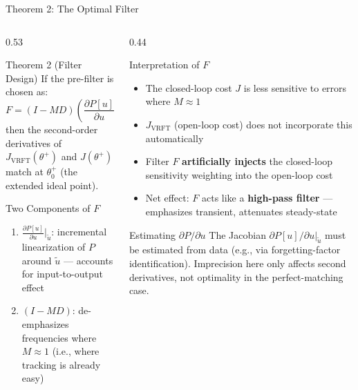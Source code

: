 \documentclass[aspectratio=169]{beamer}
\newcommand{\highlight}[1]{{\color{accentgreen!70!black}\textbf{#1}}}
\newcommand{\JJ}{J_{\mathrm{VRFT}}}
\newcommand{\Jopt}{J}
\begin{document}
\begin{frame}{Theorem 2: The Optimal Filter}
  \begin{columns}[T]
    \begin{column}{0.53\textwidth}
      \begin{block}{Theorem 2 (Filter Design)}
        If the pre-filter is chosen as:
        \[
          \boxed{F = (I - MD)\left(\frac{\partial P[u]}{\partial u}\bigg|_{\tilde{u}}\right)}
        \]
        then the second-order derivatives of $\JJ(\theta^+)$ and $\Jopt(\theta^+)$ match at $\theta^+_0$ (the extended ideal point).
      \end{block}
      \vspace{0.4em}
      \begin{block}{Two Components of $F$}
        \begin{enumerate}
          \item $\displaystyle\frac{\partial P[u]}{\partial u}\Big|_{\tilde{u}}$: incremental linearization of $P$ around $\tilde{u}$ --- accounts for input-to-output effect
          \item $(I - MD)$: de-emphasizes frequencies where $M \approx 1$ (i.e., where tracking is already easy)
        \end{enumerate}
      \end{block}
    \end{column}
    \begin{column}{0.44\textwidth}
      \begin{exampleblock}{Interpretation of $F$}
        \begin{itemize}
          \item The closed-loop cost $J$ is less sensitive to errors where $M \approx 1$
          \item $\JJ$ (open-loop cost) does not incorporate this automatically
          \item Filter $F$ \highlight{artificially injects} the closed-loop sensitivity weighting into the open-loop cost
          \item Net effect: $F$ acts like a \textbf{high-pass filter} --- emphasizes transient, attenuates steady-state
        \end{itemize}
      \end{exampleblock}
      \vspace{0.2em}
      \begin{alertblock}{Estimating $\partial P / \partial u$}
        The Jacobian $\partial P[u]/\partial u|_{\tilde{u}}$ must be estimated from data (e.g., via forgetting-factor identification). Imprecision here only affects second derivatives, not optimality in the perfect-matching case.
      \end{alertblock}
    \end{column}
  \end{columns}
\end{frame}
\end{document}
